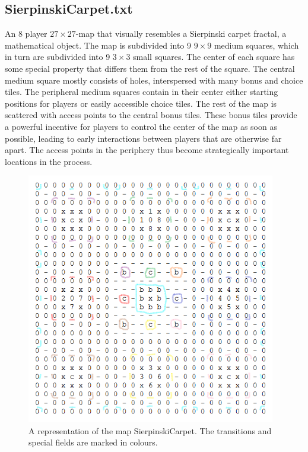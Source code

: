 \subsection{SierpinskiCarpet.txt}
An 8 player $27\times27$-map that visually resembles a Sierpinski carpet fractal, a mathematical object. The map is subdivided into 9 $9\times9$ medium squares, which in turn are subdivided into 9 $3\times3$ small squares. The center of each square has some special property that differs them from the rest of the square. The central medium square mostly consists of holes, interspersed with many bonus and choice tiles. The peripheral medium squares contain in their center either starting positions for players or easily accessible choice tiles. The rest of the map is scattered with access points to the central bonus tiles. These bonus tiles provide a powerful incentive for players to control the center of the map as soon as possible, leading to early interactions between players that are otherwise far apart. The access points in the periphery thus become strategically important locations in the process.



\begin{figure}[H]
    \centering
    \includegraphics[height=11cm]{pictures/assignment1/SierpinskiCarpet.PNG}
    \caption{A representation of the map SierpinskiCarpet. The transitions and special fields are marked in colours.}
    \label{fig:SierpinskiCarpet}
\end{figure}

